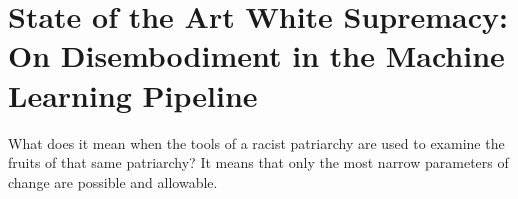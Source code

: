 \ifpdf
    \graphicspath{{Chapter7/Figs/Raster/}{Chapter7/Figs/PDF/}{Chapter7/Figs/}}
\else
    \graphicspath{{Chapter7/Figs/Vector/}{Chapter7/Figs/}}
\fi


\chapter[State of the Art White Supremacy: On Disembodiment in the Machine Learning Pipeline]{State of the Art White Supremacy: On Disembodiment in the Machine Learning Pipeline\footnotemark{}}\label{chap:disembodied}

\begin{citequote}{\citet[p.110-111]{Lorde:1984}}
What does it mean when the tools of a racist patriarchy are used to examine the fruits of that same patriarchy?  It means that only the most narrow parameters of change are possible and allowable.
\end{citequote}

